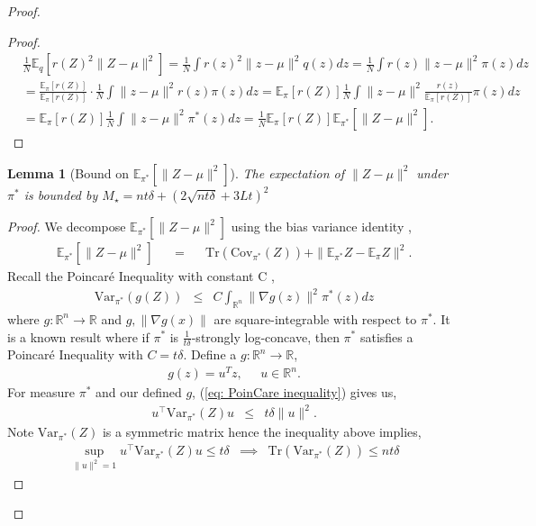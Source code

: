 \documentclass{article}
\newcommand{\Real}{\mathbb{R}}
\newcommand{\E}{\mathbb{E}}
\newcommand{\amp}{\mathop{\:\:\,}\nolimits}
\theoremstyle{plain}
\newtheorem{lemma}[theorem]{Lemma}
\theoremstyle{definition}
\theoremstyle{remark}
\begin{document}
\begin{proof}
\begin{proof}
\begin{align}
    &\frac{1}{N}\E_q[r(Z)^2\|Z-\mu\|^2] = \frac{1}{N}\int r(z)^2\|z-\mu\|^2q(z)dz = \frac{1}{N}\int r(z)\|z-\mu\|^2 \pi(z)dz \label{eq: Exapsnsion of numerator pt 1}\\ 
    &= \frac{\E_\pi[r(Z)]}{\E_\pi[r(Z)]} \cdot \frac{1}{N} \int \|z-\mu\|^2r(z)\pi(z)dz = \E_\pi[r(Z)] \frac{1}{N}\int\|z-\mu\|^2 \frac{r(z)}{\E_\pi[r(Z)]} \pi(z)dz
    \\&= \E_\pi[r(Z)] \frac{1}{N}\int\|z-\mu\|^2 \pi^*(z)dz= \frac{1}{N}\E_\pi[r(Z)]\E_{\pi^*}[\|Z-\mu\|^2] \label{eq: Exapsnsion of numerator pt 3}.
\end{align}
\end{proof}
\begin{lemma}[Bound on {$\E_{\pi^*}[\|Z-\mu\|^2]$}]\label{lem: M Bound}
The expectation of $\|Z- \mu\|^2$ under $\pi^*$ is bounded by $M_\star = nt\delta + (2\sqrt{nt\delta} + 3Lt)^2$
\end{lemma}
\begin{proof}
    We decompose $\E_{\pi^*}[\|Z- \mu\|^2]$ using the bias variance identity \cite{MardiaKentBibby1979pdf}, 
    \begin{eqnarray}
        \E_{\pi^*}[\|Z-\mu\|^2] \amp = \amp \text{Tr}(\text{Cov}_{\pi^*}(Z)) + \|\E_{\pi^*}Z - \E_\pi Z\|^2.
    \end{eqnarray}
Recall the Poincaré Inequality with constant C \cite{BalasubramanianEtAl2022},
\begin{eqnarray}\label{eq: PoinCare inequality}
    \text{Var}_{\pi^*}(g(Z)) &\leq& C \int_{\Real^n}\|\nabla g(z)\|^2\pi^*(z)dz 
\end{eqnarray}
where $g: \Real^n \rightarrow\Real$ and $g,\|\nabla g(x)\|$ are square-integrable with respect to $\pi^*$. It is a known result where if $\pi^*$ is $\frac{1}{t\delta}$-strongly log-concave, then $\pi^*$ satisfies a Poincaré Inequality with $C = t\delta$.
Define a $g: \Real^n \rightarrow \Real$, 
\begin{eqnarray}
    g(z) = u^Tz, \amp u \in \Real^n.
\end{eqnarray}
For measure $\pi^*$ and our defined $g$, (\ref{eq: PoinCare inequality}) gives us, 
\begin{eqnarray}
    u^\top\text{Var}_{\pi^*}(Z)u &\leq& t\delta \|u\|^2.
\end{eqnarray}
Note $\text{Var}_{\pi^*}(Z)$ is a symmetric matrix hence the inequality above implies, 
\begin{eqnarray}\label{eq: bounding the sup of Sigma}
    \sup_{\|u\|^2 =1} u^\top \text{Var}_{\pi^*}(Z) u \leq t\delta &\implies & \text{Tr}(\text{Var}_{\pi^*}(Z)) \leq nt\delta

\end{eqnarray}
\end{proof}
\end{proof}
\end{document}
